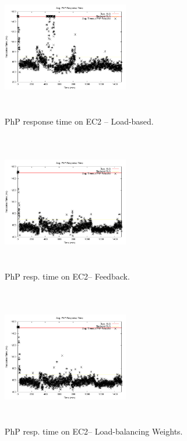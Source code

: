 \begin{figure}
\begin{center}
\includegraphics[width=0.49\textwidth, height=6cm]{./images/heterogeneous/avgTimeout_PhP_naive}
\end{center}
\caption{PhP  response time on EC2 -- Load-based.}
\label{naiveEC2}
\end{figure}


\begin{figure}
\begin{center}
\includegraphics[width=0.49\textwidth, height=6cm]{./images/heterogeneous/avgTimeout_PhP_history}
\end{center}
\caption{PhP resp. time on EC2-- Feedback.}
\label{historyEC2}
\end{figure}

\begin{figure}
\begin{center}
\includegraphics[width=0.49\textwidth, height=6cm]{./images/heterogeneous/avgTimeout_PhP_weightHistory}
\end{center}
\caption{ PhP resp. time on EC2-- Load-balancing Weights.}
\label{historyWeightEC2}
\end{figure}

